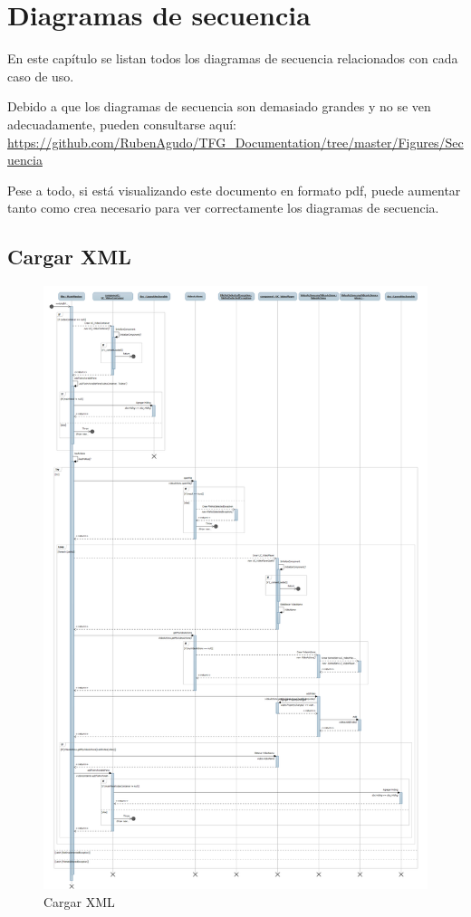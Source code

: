 \chapter{Diagramas de secuencia}
En este cap\'itulo se listan todos los diagramas de secuencia
relacionados con cada caso de uso.

Debido a que los diagramas de secuencia son demasiado grandes y
no se ven adecuadamente, pueden consultarse aqu\'i: 
\url{https://github.com/RubenAgudo/TFG_Documentation/tree/master/Figures/Secuencia}

Pese a todo, si est\'a visualizando este documento en formato pdf, puede aumentar
tanto como crea necesario para ver correctamente los diagramas de secuencia.

\cleardoublepage
\section{Cargar XML}

\begin{figure}[H]
\centering
\includegraphics[width=0.85\linewidth]{./Figures/Secuencia/CargarXML.png}
\caption{Cargar XML}
\label{fig:CargarXML}
\end{figure}


